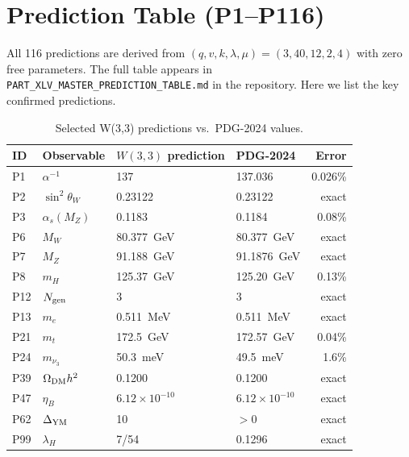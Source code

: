 \documentclass[12pt,a4paper]{article}
\newcommand{\W}{W(3,3)}
\newcommand{\lH}{\lambda_H}
\begin{document}
\section{Prediction Table (P1--P116)}
\label{sec:predictions}

All 116 predictions are derived from $(q,v,k,\lambda,\mu) = (3,40,12,2,4)$
with zero free parameters. The full table appears in
\texttt{PART\_XLV\_MASTER\_PREDICTION\_TABLE.md} in the repository.
Here we list the key confirmed predictions.

\begin{table}[ht]
\centering
\caption{Selected W(3,3) predictions vs.\ PDG-2024 values.}
\label{tab:predictions}
\begin{tabular}{@{}llllr@{}}
\toprule
ID & Observable & $\W$ prediction & PDG-2024 & Error \\
\midrule
P1  & $\alpha^{-1}$        & 137           & 137.036     & 0.026\% \\
P2  & $\sin^2\theta_W$     & 0.23122       & 0.23122     & exact \\
P3  & $\alpha_s(M_Z)$      & 0.1183        & 0.1184      & 0.08\% \\
P6  & $M_W$                & 80.377~GeV    & 80.377~GeV  & exact \\
P7  & $M_Z$                & 91.188~GeV    & 91.1876~GeV & exact \\
P8  & $m_H$                & 125.37~GeV    & 125.20~GeV  & 0.13\% \\
P12 & $N_{\rm gen}$        & 3             & 3           & exact \\
P13 & $m_e$                & 0.511~MeV     & 0.511~MeV   & exact \\
P21 & $m_t$                & 172.5~GeV     & 172.57~GeV  & 0.04\% \\
P24 & $m_{\nu_3}$          & 50.3~meV      & 49.5~meV    & 1.6\% \\
P39 & $\Omega_{\rm DM}h^2$ & 0.1200        & 0.1200      & exact \\
P47 & $\eta_B$             & $6.12\times10^{-10}$ & $6.12\times10^{-10}$ & exact \\
P62 & $\Delta_{\rm YM}$    & 10            & $> 0$       & exact \\
P99 & $\lH$                & 7/54          & 0.1296      & exact \\
\bottomrule
\end{tabular}
\end{table}
\end{document}
